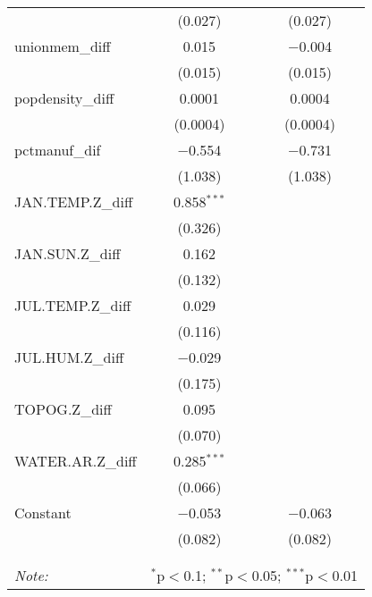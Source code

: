 \begin{table}[!htbp]
\begin{tabular}{@{\extracolsep{5pt}}lcc}
  & (0.027) & (0.027) \\ 
  unionmem\_diff & 0.015 & $-$0.004 \\ 
  & (0.015) & (0.015) \\ 
  popdensity\_diff & 0.0001 & 0.0004 \\ 
  & (0.0004) & (0.0004) \\ 
  pctmanuf\_dif & $-$0.554 & $-$0.731 \\ 
  & (1.038) & (1.038) \\ 
  JAN.TEMP.Z\_diff & 0.858$^{***}$ &  \\ 
  & (0.326) &  \\ 
  JAN.SUN.Z\_diff & 0.162 &  \\ 
  & (0.132) &  \\ 
  JUL.TEMP.Z\_diff & 0.029 &  \\ 
  & (0.116) &  \\ 
  JUL.HUM.Z\_diff & $-$0.029 &  \\ 
  & (0.175) &  \\ 
  TOPOG.Z\_diff & 0.095 &  \\ 
  & (0.070) &  \\ 
  WATER.AR.Z\_diff & 0.285$^{***}$ &  \\ 
  & (0.066) &  \\ 
  Constant & $-$0.053 & $-$0.063 \\ 
  & (0.082) & (0.082) \\ 
 \hline \\[-1.8ex] 
\hline 
\hline \\[-1.8ex] 
\textit{Note:}  & \multicolumn{2}{r}{$^{*}$p$<$0.1; $^{**}$p$<$0.05; $^{***}$p$<$0.01} \\ 
\end{tabular} 
\end{table} 
